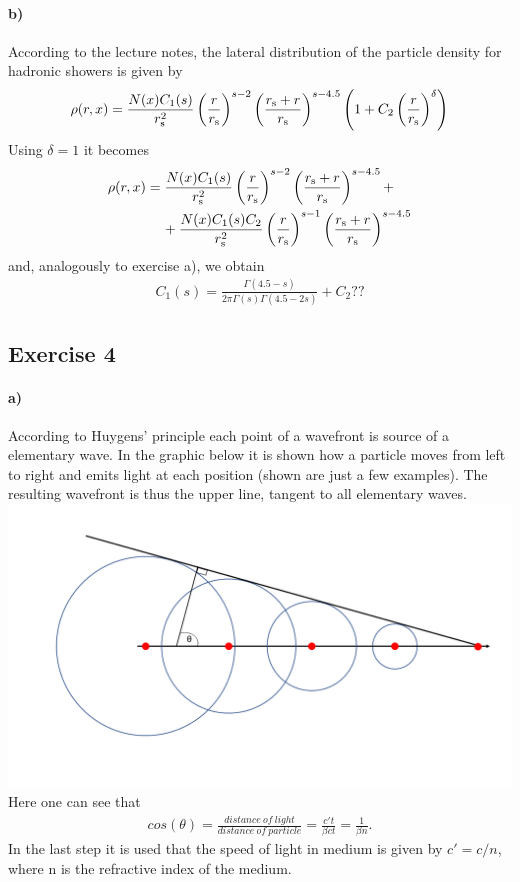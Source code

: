 \documentclass{article}
\begin{document}
\paragraph{b)}
According to the lecture notes, the lateral distribution of the particle density for hadronic showers is given by
\begin{align}
\rho(r,x)=\frac{N(x)C_1(s)}{r_{\rm s}^{2}}\left(\frac{r}{r_{\rm s}}\right)^{s-2}\left(\frac{r_{\rm s}+r}{r_{\rm s}}\right)^{s-4.5}\left(1+C_2\left(\frac{r}{r_{\rm s}}\right)^{\delta}\right)
\end{align}
Using $\delta=1$ it becomes
\begin{align}
\nonumber
\rho(r,x) & =\frac{N(x)C_1(s)}{r_{\rm s}^{2}}\left(\frac{r}{r_{\rm s}}\right)^{s-2}\left(\frac{r_{\rm s}+r}{r_{\rm s}}\right)^{s-4.5}+\\ &\hspace{0.4 cm}+\frac{N(x)C_1(s)C_2}{r_{\rm s}^{2}}\left(\frac{r}{r_{\rm s}}\right)^{s-1}\left(\frac{r_{\rm s}+r}{r_{\rm s}}\right)^{s-4.5}
\end{align}
and, analogously to exercise a), we obtain
\begin{align}
C_1(s)=\frac{\Gamma(4.5-s)}{2\pi \Gamma(s)\Gamma(4.5-2s)}+C_2??
\end{align} 

\subsection*{Exercise 4}
\paragraph{a)}
According to Huygens' principle each point of a wavefront is source of a elementary wave. 
In the graphic below it is shown how a particle moves from left to right and emits light at each position (shown are just a few examples). 
The resulting wavefront is thus the upper line, tangent to all elementary waves. \\
\includegraphics[width=\textwidth]{exercise4.png}\\
Here one can see that 
\begin{align*}
cos(\theta) = \frac{distance\ of\ light}{distance\ of\ particle} = \frac{c't}{\beta c t} = \frac{1}{\beta n}.
\end{align*}
In the last step it is used that the speed of light in medium is given by $c' = c / n$, where n is the refractive index of the medium.
\end{document}
